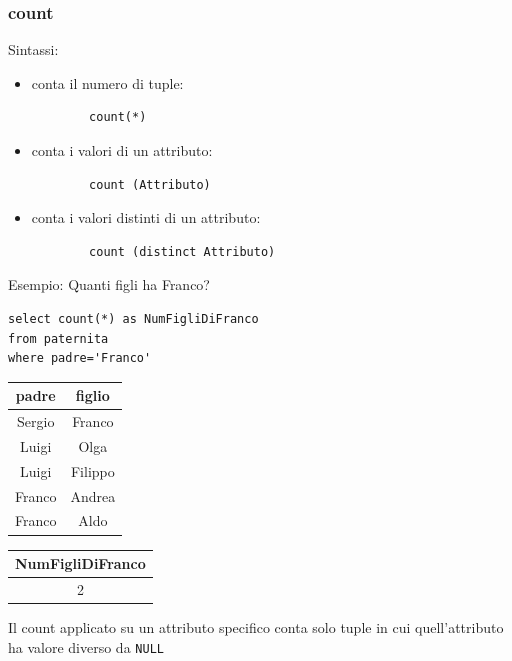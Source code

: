 \subsubsection{count}
Sintassi:\\
\begin{itemize}
    \item conta il numero di tuple: \begin{verbatim}
        count(*)
    \end{verbatim}
    \item conta i valori di un attributo: \begin{verbatim}
        count (Attributo)
    \end{verbatim}
    \item conta i valori distinti di un attributo: \begin{verbatim}
        count (distinct Attributo)
    \end{verbatim}
\end{itemize}
\noindent \textcolor{verdeEsempio}{Esempio:} Quanti figli ha Franco?\\
\begin{verbatim}
select count(*) as NumFigliDiFranco
from paternita
where padre='Franco'
\end{verbatim}
\begin{center}
\begin{minipage}{0.45\textwidth}
    \centering
    \begin{tabular}{|c|c|}
        \hline
        \textbf{padre} & \textbf{figlio} \\ \hline
        Sergio & Franco \\ \hline
        Luigi & Olga \\ \hline
        Luigi & Filippo \\ \hline
        Franco & Andrea \\ \hline
        Franco & Aldo \\ \hline
    \end{tabular}
\end{minipage}
\hfil
\begin{minipage}{0.45\textwidth}
    \centering
    \begin{tabular}{|c|}
        \hline
        \textbf{NumFigliDiFranco} \\ \hline
        2 \\ \hline
    \end{tabular}
\end{minipage}
\end{center}
\noindent Il count applicato su un attributo specifico conta solo tuple in cui quell'attributo ha valore diverso da \texttt{NULL}

